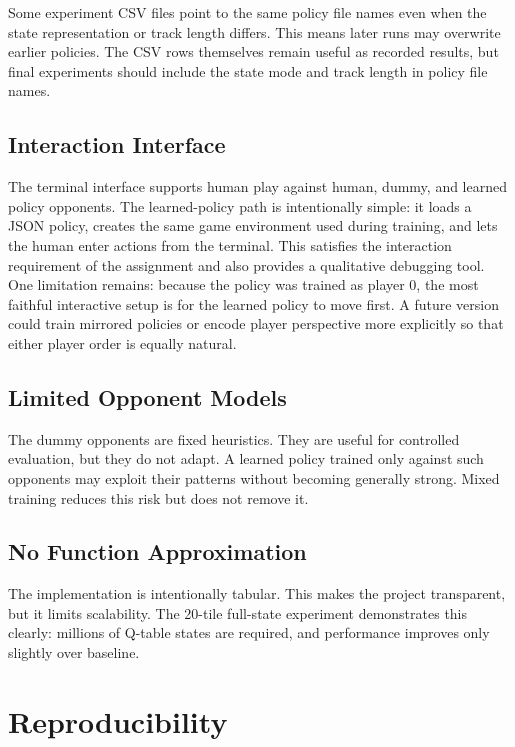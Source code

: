 \documentclass[conference]{IEEEtran}
\begin{document}
Some experiment CSV files point to the same policy file names even when the state
representation or track length differs. This means later runs may overwrite earlier
policies. The CSV rows themselves remain useful as recorded results, but final
experiments should include the state mode and track length in policy file names.

\subsection{Interaction Interface}

The terminal interface supports human play against human, dummy, and learned
policy opponents. The learned-policy path is intentionally simple: it loads a JSON
policy, creates the same game environment used during training, and lets the human
enter actions from the terminal. This satisfies the interaction requirement of the
assignment and also provides a qualitative debugging tool. One limitation remains:
because the policy was trained as player 0, the most faithful interactive setup is
for the learned policy to move first. A future version could train mirrored
policies or encode player perspective more explicitly so that either player order
is equally natural.

\subsection{Limited Opponent Models}

The dummy opponents are fixed heuristics. They are useful for controlled
evaluation, but they do not adapt. A learned policy trained only against such
opponents may exploit their patterns without becoming generally strong. Mixed
training reduces this risk but does not remove it.

\subsection{No Function Approximation}

The implementation is intentionally tabular. This makes the project transparent,
but it limits scalability. The 20-tile full-state experiment demonstrates this
clearly: millions of Q-table states are required, and performance improves only
slightly over baseline.

\section{Reproducibility}
\end{document}
